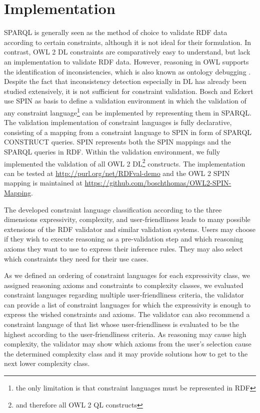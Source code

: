 \documentclass{llncs}
\begin{document}
\section{Implementation}
\label{Implementation}

SPARQL is generally seen as the method of choice to validate RDF data according to certain constraints, although it is not ideal for their formulation. 
In contrast, OWL 2 DL constraints are comparatively easy to understand, but lack an implementation to validate RDF data. However, reasoning in OWL supports the identification of inconsistencies, which is also known as ontology debugging \cite{stuckenschmidt2008debugging}. Despite the fact that inconsistency detection especially in DL has already been studied extensively, it is not sufficient for constraint validation.
Bosch and Eckert\cite{BoschEckert2014-2} use SPIN as basis to define a
validation environment in which the validation of any constraint language\footnote{the only limitation is that constraint languages must be represented in RDF} can be implemented by representing them in SPARQL. 
The validation implementation of constraint languages is fully declarative,
consisting of a mapping from a constraint language to SPIN in form of SPARQL CONSTRUCT queries.
SPIN represents both the SPIN mappings and the SPARQL queries in RDF. 
Within the validation environment, we fully implemented the validation of all OWL 2 DL\footnote{and therefore all OWL 2 QL constructs} constructs. 
The implementation can be tested at \url{http://purl.org/net/RDFval-demo} and
the OWL 2 SPIN mapping is maintained at \url{https://github.com/boschthomas/OWL2-SPIN-Mapping}.

The developed constraint language classification according to the three dimensions expressivity, complexity, and user-friendliness leads to many possible extensions of the RDF validator and similar validation systems.
Users may choose if they wish to execute reasoning as a pre-validation step and which reasoning axioms they want to use to express their inference rules.
They may also select which constraints they need for their use cases.

As we defined an ordering of constraint languages for each expressivity class, we assigned reasoning axioms and constraints to complexity classes, we evaluated constraint languages regarding multiple user-friendliness criteria, the validator can provide a list of constraint languages for which the expressivity is enough to express the wished constraints and axioms.
The validator can also recommend a constraint language of that list whose user-friendliness is evaluated to be the highest according to the user-friendliness criteria.
As reasoning may cause high complexity, the validator may show which axioms from the user's selection cause the determined complexity class 
and it may provide solutions how to get to the next lower complexity class.
\end{document}
